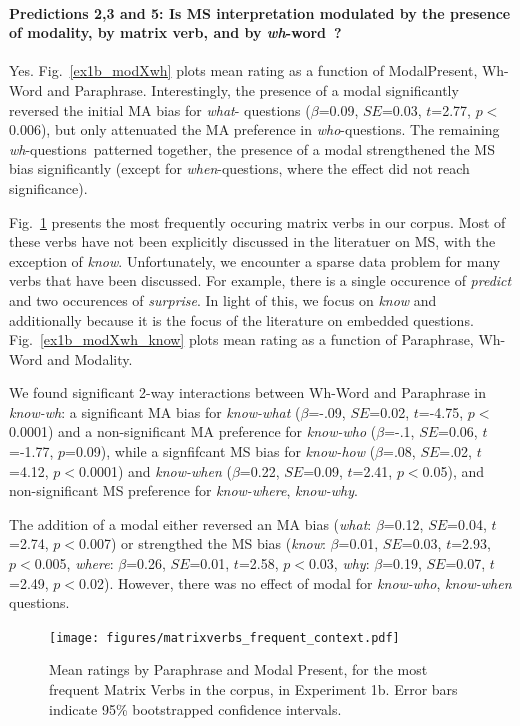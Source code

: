 \documentclass[12pt,letterpaper,table,svgnames,dvipsnames]{article}
\newcommand{\figref}[1]{Fig.~\ref{#1}}
\newcommand{\whqs}{\emph{wh}-questions~}
\newcommand{\whw}{\emph{wh}-word~}
\begin{document}
\paragraph{Predictions 2,3 and 5: Is MS interpretation modulated by the presence of modality, by matrix verb, and by \whw?}
Yes. \figref{ex1b_modXwh} plots mean rating as a function of ModalPresent, Wh-Word and Paraphrase. Interestingly, the presence of a modal significantly reversed the initial MA bias for \emph{what}- questions ($\beta$=0.09, $SE$=0.03, $t$=2.77, $p<$0.006), but only attenuated the MA preference in \emph{who}-questions. The remaining \whqs patterned together, the presence of a modal strengthened the MS bias significantly (except for \emph{when}-questions, where the effect did not reach significance).

\figref{ex1b_matrix_verbs} presents the most frequently occuring matrix verbs in our corpus. Most of these verbs have not been explicitly discussed in the literatuer on MS, with the exception of \emph{know}. Unfortunately, we encounter a sparse data problem for many verbs that have been discussed. For example, there is a single occurence of \emph{predict} and two occurences of \emph{surprise}. In light of this, we focus on \emph{know} and additionally because it is the focus of the literature on embedded questions. \figref{ex1b_modXwh_know} plots mean rating as a function of Paraphrase, Wh-Word and Modality. 

We found significant 2-way interactions between Wh-Word and Paraphrase in \emph{know-wh}: a significant MA bias for \emph{know-what} ($\beta$=-.09, $SE$=0.02, $t$=-4.75, $p<$0.0001) and a non-significant MA preference for \emph{know-who} ($\beta$=-.1, $SE$=0.06, $t$=-1.77, $p$=0.09), while a signfifcant MS bias for \emph{know-how} ($\beta$=.08, $SE$=.02, $t$=4.12, $p<$0.0001) and \emph{know-when} ($\beta$=0.22, $SE$=0.09, $t$=2.41, $p<$0.05), and non-significant MS preference for \emph{know-where}, \emph{know-why}.

The addition of a modal either reversed an MA bias (\emph{what}: $\beta$=0.12, $SE$=0.04, $t$=2.74, $p<$0.007) or strengthed the MS bias (\emph{know}: $\beta$=0.01, $SE$=0.03, $t$=2.93, $p<$0.005, \emph{where}: $\beta$=0.26, $SE$=0.01, $t$=2.58, $p<$0.03, \emph{why}: $\beta$=0.19, $SE$=0.07, $t$=2.49, $p<$0.02). However, there was no effect of modal for \emph{know-who}, \emph{know-when} questions.

\begin{figure}[h!]
\centering
\texttt{[image: figures/matrixverbs\_frequent\_context.pdf]}
\caption{Mean ratings by Paraphrase and Modal Present, for the most frequent Matrix Verbs in the corpus, in Experiment 1b. Error bars indicate 95\% bootstrapped confidence intervals.}
\label{ex1b_matrix_verbs}
\end{figure}
\end{document}

